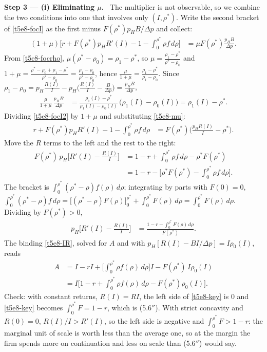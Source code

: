 \documentclass[11pt,a4paper]{article}
\newcommand{\step}[2]{\par\medskip\noindent\textbf{Step #1 --- #2.}~}
\begin{document}
\step{3}{(i) Eliminating $\mu$} The multiplier is not observable, so we combine the two conditions into
one that involves only $(I,\rho^*)$. Write the second bracket of \eqref{t5e8-focI} as the first minus
$F(\rho^*)p_HB/\Delta p$ and collect:
\begin{align}
  (1+\mu)\Big[r+F(\rho^*)p_HR'(I)-1-\int_0^{\rho^*}\!\rho f\,d\rho\Big] &= \mu F(\rho^*)\frac{p_HB}{\Delta p}. \label{t5e8-focI2}
\end{align}
From \eqref{t5e8-focrho}, $\mu(\rho^*-\rho_0)=\rho_1-\rho^*$, so
$\mu=\frac{\rho_1-\rho^*}{\rho^*-\rho_0}$ and $1+\mu=\frac{\rho^*-\rho_0+\rho_1-\rho^*}{\rho^*-\rho_0}=\frac{\rho_1-\rho_0}{\rho^*-\rho_0}$,
hence $\frac{\mu}{1+\mu}=\frac{\rho_1-\rho^*}{\rho_1-\rho_0}$. Since
$\rho_1-\rho_0=p_H\frac{R(I)}{I}-p_H\Big(\frac{R(I)}{I}-\frac{B}{\Delta p}\Big)=\frac{p_HB}{\Delta p}$,
\begin{align}
  \frac{\mu}{1+\mu}\,\frac{p_HB}{\Delta p} &= \frac{\rho_1(I)-\rho^*}{\rho_1(I)-\rho_0(I)}\,\bigl(\rho_1(I)-\rho_0(I)\bigr) = \rho_1(I)-\rho^*. \label{t5e8-mu}
\end{align}
Dividing \eqref{t5e8-focI2} by $1+\mu$ and substituting \eqref{t5e8-mu}:
\begin{align}
  r+F(\rho^*)p_HR'(I)-1-\int_0^{\rho^*}\!\rho f\,d\rho &= F(\rho^*)\Big(\frac{p_HR(I)}{I}-\rho^*\Big). \nonumber
\end{align}
Move the $R$ terms to the left and the rest to the right:
\begin{align}
  F(\rho^*)\,p_H\Big[R'(I)-\frac{R(I)}{I}\Big] &= 1-r+\int_0^{\rho^*}\!\rho f\,d\rho-\rho^*F(\rho^*) \nonumber\\
  &= 1-r-\Big[\rho^*F(\rho^*)-\int_0^{\rho^*}\!\rho f\,d\rho\Big]. \nonumber
\end{align}
The bracket is $\int_0^{\rho^*}(\rho^*-\rho)f(\rho)\,d\rho$; integrating by parts with $F(0)=0$,
$\int_0^{\rho^*}(\rho^*-\rho)f\,d\rho=\big[(\rho^*-\rho)F(\rho)\big]_0^{\rho^*}+\int_0^{\rho^*}F(\rho)\,d\rho=\int_0^{\rho^*}F(\rho)\,d\rho$.
Dividing by $F(\rho^*)>0$,
\begin{align}
  p_H\Big[R'(I)-\frac{R(I)}{I}\Big] &= \frac{1-r-\int_0^{\rho^*}F(\rho)\,d\rho}{F(\rho^*)}. \label{t5e8-key}
\end{align}
The binding \eqref{t5e8-IR}, solved for $A$ and with $p_H[R(I)-BI/\Delta p]=I\rho_0(I)$, reads
\begin{align}
  A &= I-rI+\Big[\int_0^{\rho^*}\rho f(\rho)\,d\rho\Big]I-F(\rho^*)\,I\rho_0(I) \nonumber\\
    &= I\Big[1-r+\int_0^{\rho^*}\rho f(\rho)\,d\rho - F(\rho^*)\rho_0(I)\Big]. \label{t5e8-IRb}
\end{align}
Check: with constant returns, $R(I)=RI$, the left side of \eqref{t5e8-key} is 0 and \eqref{t5e8-key} becomes
$\int_0^{\rho^*}F=1-r$, which is (5.6$''$). With strict concavity and $R(0)=0$, $R(I)/I>R'(I)$, so the left
side is negative and $\int_0^{\rho^*}F>1-r$: the marginal unit of scale is worth less than the average one,
so at the margin the firm spends more on continuation and less on scale than (5.6$''$) would say.
\end{document}
